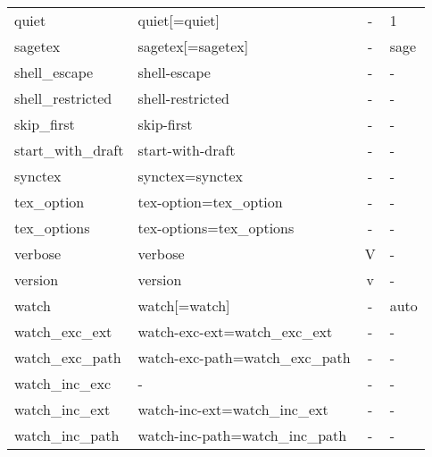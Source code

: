 \begin{longtable}{llcX}
quiet & quiet[=quiet] & - & 1 \\
sagetex & sagetex[=sagetex] & - & sage \\
shell\_escape & shell-escape & - & - \\
shell\_restricted & shell-restricted & - & - \\
skip\_first & skip-first & - & - \\
start\_with\_draft & start-with-draft & - & - \\
synctex & synctex=synctex & - & - \\
tex\_option & tex-option=tex\_option & - & - \\
tex\_options & tex-options=tex\_options & - & - \\
verbose & verbose & V & - \\
version & version & v & - \\
watch & watch[=watch] & - & auto \\
watch\_exc\_ext & watch-exc-ext=watch\_exc\_ext & - & - \\
watch\_exc\_path & watch-exc-path=watch\_exc\_path & - & - \\
watch\_inc\_exc & - & - & - \\
watch\_inc\_ext & watch-inc-ext=watch\_inc\_ext & - & - \\
watch\_inc\_path & watch-inc-path=watch\_inc\_path & - & - \\
\bottomrule
\end{longtable}